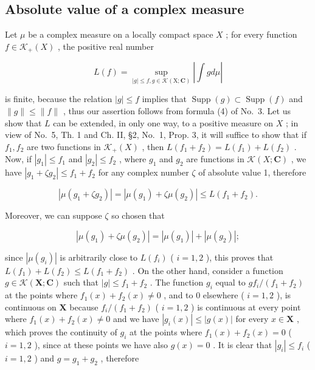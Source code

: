 \subsection{Absolute value of a complex measure}

Let \(\mu\) be a complex measure on a locally compact space \(X\) ; for every function \(f \in \mathcal{K}_{+}(X)\) , the positive real number

\[
L (f) = \sup _ {| g | \leqslant f, g \in \mathcal {K} (\mathrm{X}; \mathbf {C})} \left| \int g d \mu \right|\tag{11}
\]

is finite, because the relation \(|g| \leqslant f\) implies that \(\operatorname{Supp}(g) \subset \operatorname{Supp}(f)\) and \(\| g \| \leqslant \| f \|\) , thus our assertion follows from formula (4) of No.~3. Let us show that \(L\) can be extended, in only one way, to a positive measure on \(X\) ; in view of No.~5, Th. 1 and Ch. II, §2, No.~1, Prop. 3, it will suffice to show that if \(f_1, f_2\) are two functions in \(\mathcal{K}_+(X)\) , then \(L(f_1 + f_2) = L(f_1) + L(f_2)\) . Now, if \(|g_1| \leqslant f_1\) and \(|g_2| \leqslant f_2\) , where \(g_1\) and \(g_2\) are functions in \(\mathcal{K}(X; \mathbf{C})\) , we have \(|g_1 + \zeta g_2| \leqslant f_1 + f_2\) for any complex number \(\zeta\) of absolute value 1, therefore

\[
\left| \mu (g _ {1} + \zeta g _ {2}) \right| = \left| \mu (g _ {1}) + \zeta \mu (g _ {2}) \right| \leqslant L (f _ {1} + f _ {2}).
\]

Moreover, we can suppose \(\zeta\) so chosen that

\[
\left| \mu (g _ {1}) + \zeta \mu (g _ {2}) \right| = \left| \mu (g _ {1}) \right| + \left| \mu (g _ {2}) \right|;
\]

since \(|\mu(g_i)|\) is arbitrarily close to \(L(f_i)\) ( \(i = 1,2\) ), this proves that \(L(f_1) + L(f_2) \leqslant L(f_1 + f_2)\) . On the other hand, consider a function \(g \in \mathcal{K}(\mathbf{X};\mathbf{C})\) such that \(|g| \leqslant f_1 + f_2\) . The function \(g_i\) equal to \(g f_i / (f_1 + f_2)\) at the points where \(f_1(x) + f_2(x) \neq 0\) , and to 0 elsewhere ( \(i = 1,2\) ), is continuous on \(\mathbf{X}\) because \(f_i / (f_1 + f_2)\) ( \(i = 1,2\) ) is continuous at every point where \(f_1(x) + f_2(x) \neq 0\) and we have \(|g_i(x)| \leqslant |g(x)|\) for every \(x \in \mathbf{X}\) , which proves the continuity of \(g_i\) at the points where \(f_1(x) + f_2(x) = 0\) ( \(i = 1,2\) ), since at these points we have also \(g(x) = 0\) . It is clear that \(|g_i| \leqslant f_i\) ( \(i = 1,2\) ) and \(g = g_1 + g_2\) , therefore

